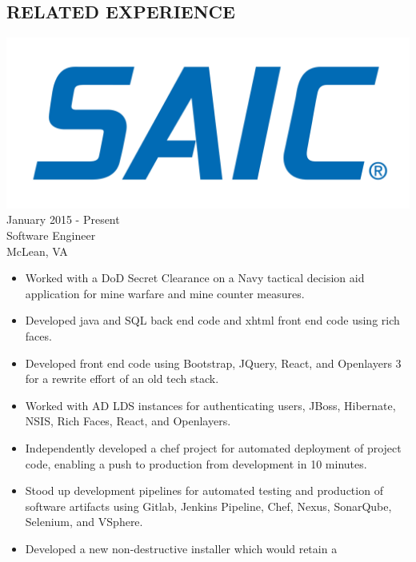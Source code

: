 \documentclass[12pt, line, margin]{res}
\begin{document}
\begin{resume}
\section{RELATED EXPERIENCE} {\sl  \includegraphics[scale=0.015, trim=110 200 110 120]{resume_images/SAIC_logo_RGB-lg.jpg}} \hfill January 2015 - Present \\
                Software Engineer \\
                McLean, VA
                 \begin{itemize}  \itemsep -2pt %
              \item   Worked with a DoD Secret Clearance on a Navy tactical decision
			aid application for mine warfare and mine counter measures.
	      \item   Developed java and SQL back end code and xhtml front end code
			using rich faces.
	      \item   Developed front end code using Bootstrap, JQuery, React, and 
			Openlayers 3 for a rewrite effort of an old tech stack.
	      \item   Worked with AD LDS instances for authenticating users, JBoss, \newline
			Hibernate, NSIS, Rich Faces, React, and Openlayers.
	      \item   Independently developed a chef project for automated \newline 
			deployment of project code, enabling a push to production \newline
			from development in 10 minutes.
	      \item  Stood up development pipelines for automated testing and \newline
		        production of software artifacts using Gitlab, Jenkins Pipeline, \newline
                        Chef, Nexus, SonarQube, Selenium, and VSphere.
	      \item   Developed a new non-destructive installer which would retain a \newline

\end{itemize}
\end{resume}
\end{document}
